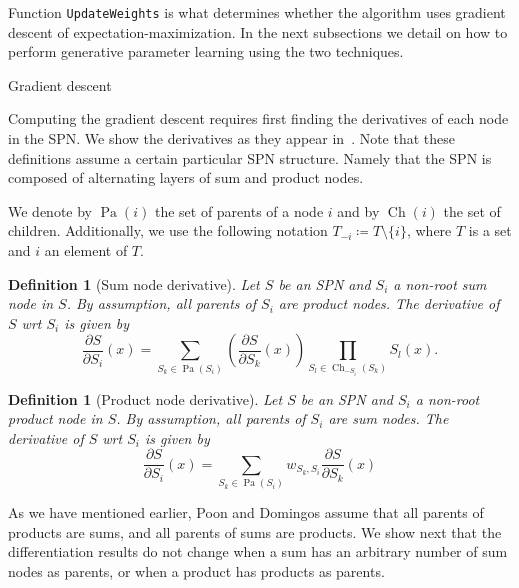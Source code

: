\documentclass{amsart}
\makeatletter
\def\subsection{\@startsection{subsection}{3}%
  \z@{.5\linespacing\@plus.7\linespacing}{.1\linespacing}%
  {\normalfont}}
\DeclareMathOperator*{\Ch}{\text{Ch}}
\DeclareMathOperator*{\Pa}{\text{Pa}}
\theoremstyle{plain}
\newcounter{dummy-def}\numberwithin{dummy-def}{section}
\newtheorem{definition}[dummy-def]{Definition}
\newcounter{dummy-thm}\numberwithin{dummy-thm}{section}
\newcounter{dummy-prop}\numberwithin{dummy-prop}{section}
\newcounter{dummy-corollary}\numberwithin{dummy-corollary}{section}
\newcounter{dummy-lemma}\numberwithin{dummy-lemma}{section}
\newcounter{dummy-ex}\numberwithin{dummy-ex}{section}
\newcounter{dummy-eg}\numberwithin{dummy-eg}{section}
\numberwithin{equation}{section}
\newcommand{\code}[1]{\lstinline[mathescape=true]{#1}}
\makeatother
\begin{document}
Function \code{UpdateWeights} is what determines whether the algorithm uses gradient descent of
expectation-maximization. In the next subsections we detail on how to perform generative parameter
learning using the two techniques.

\subsection{Gradient descent}

Computing the gradient descent requires first finding the derivatives of each node in the SPN\@. We
show the derivatives as they appear in~\cite{poon-domingos}. Note that these definitions assume a
certain particular SPN structure. Namely that the SPN is composed of alternating layers of sum and
product nodes.

We denote by $\Pa(i)$ the set of parents of a node $i$ and by $\Ch(i)$ the set of children.
Additionally, we use the following notation $T_{-i}\coloneqq T\setminus\{i\}$, where $T$ is a set
and $i$ an element of $T$.

\begin{definition}[Sum node derivative]\label{def:sumdiff}
  Let $S$ be an SPN and $S_i$ a non-root sum node in $S$. By assumption, all parents of $S_i$ are
  product nodes. The derivative of $S$ wrt $S_i$ is given by
  \begin{equation*}
    \frac{\partial S}{\partial S_i}(x) = \sum_{S_k\in\Pa(S_i)}\left(\frac{\partial S}{\partial
    S_k}(x) \right)\prod_{S_l\in\Ch_{-S_i}(S_k)} S_l(x).
  \end{equation*}
\end{definition}

\begin{definition}[Product node derivative]\label{def:productdiff}
  Let $S$ be an SPN and $S_i$ a non-root product node in $S$. By assumption, all parents of $S_i$
  are sum nodes. The derivative of $S$ wrt $S_i$ is given by
  \begin{equation*}
    \frac{\partial S}{\partial S_i}(x) = \sum_{S_k\in\Pa(S_i)} w_{S_k,S_i}\frac{\partial
    S}{\partial S_k}(x)
  \end{equation*}
\end{definition}

As we have mentioned earlier, Poon and Domingos assume that all parents of products are sums, and
all parents of sums are products. We show next that the differentiation results do not change when
a sum has an arbitrary number of sum nodes as parents, or when a product has products as parents.
\end{document}
